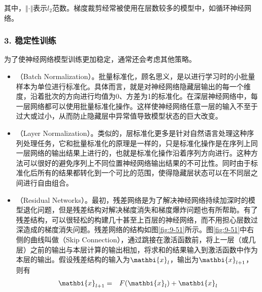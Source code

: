 \noindent 其中，$ \Vert \cdot \Vert $表示$ l_2 $范数。梯度裁剪经常被使用在层数较多的模型中，如循环神经网络。


\subsubsection{3. 稳定性训练}

\parinterval  为了使神经网络模型训练更加稳定，通常还会考虑其他策略。

\begin{itemize}
\item {\small{}}（Batch Normalization）。批量标准化，顾名思义，是以进行学习时的小批量样本为单位进行标准化。具体而言，就是对神经网络隐藏层输出的每一个维度，沿着批次的方向进行均值为0、方差为1的标准化。在深层神经网络中，每一层网络都可以使用批量标准化操作。这样使神经网络任意一层的输入不至于过大或过小，从而防止隐藏层中异常值导致模型状态的巨大改变。

\item {\small{}}（Layer Normalization）。类似的，层标准化更多是针对自然语言处理这种序列处理任务，它和批量标准化的原理是一样的，只是标准化操作是在序列上同一层网络的输出结果上进行的，也就是标准化操作沿着序列方向进行。这种方法可以很好的避免序列上不同位置神经网络输出结果的不可比性。同时由于标准化后所有的结果都转化到一个可比的范围，使得隐藏层状态可以在不同层之间进行自由组合。

\item {\small{}}（Residual Networks）。最初，残差网络是为了解决神经网络持续加深时的模型退化问题，但是残差结构对解决梯度消失和梯度爆炸问题也有所帮助。有了残差结构，可以很轻松的构建几十甚至上百层的神经网络，而不用担心层数过深造成的梯度消失问题。残差网络的结构如图\ref{fig:9-51}所示。图\ref{fig:9-51}中右侧的曲线叫做{\small{}}（Skip Connection），通过跳接在激活函数前，将上一层（或几层）之前的输出与本层计算的输出相加，将求和的结果输入到激活函数中作为本层的输出。假设残差结构的输入为$ {\mathbi{x}}_l $，输出为$ {\mathbi{x}}_{l+1} $，则有
\begin{eqnarray}
{\mathbi{x}}_{l+1}&=&F({\mathbi{x}}_l)+{\mathbi{x}}_l
\label{eq:9-44}
\end{eqnarray}


\end{itemize}
